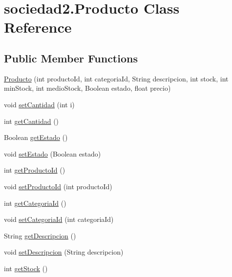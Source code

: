 \hypertarget{classsociedad2_1_1_producto}{}\section{sociedad2.\+Producto Class Reference}
\label{classsociedad2_1_1_producto}
\subsection*{Public Member Functions}
\begin{DoxyCompactItemize}
\item 
\mbox{\hyperlink{classsociedad2_1_1_producto_a5266f0ab65459040df5d351c60f46493}{Producto}} (int producto\+Id, int categoria\+Id, String descripcion, int stock, int min\+Stock, int medio\+Stock, Boolean estado, float precio)
\item 
void \mbox{\hyperlink{classsociedad2_1_1_producto_a6eec5e912ac94e10b15bc0a1e62d3a97}{set\+Cantidad}} (int i)
\item 
int \mbox{\hyperlink{classsociedad2_1_1_producto_ad1dffeff2d5eaa28cb0f4c3120bbf047}{get\+Cantidad}} ()
\item 
Boolean \mbox{\hyperlink{classsociedad2_1_1_producto_a60e7b61c9e1d4d0d1f57edee7871cadf}{get\+Estado}} ()
\item 
void \mbox{\hyperlink{classsociedad2_1_1_producto_a7f286e1bd9c4e7a16ba71cda04477139}{set\+Estado}} (Boolean estado)
\item 
int \mbox{\hyperlink{classsociedad2_1_1_producto_a501aad8759cd86d3bf35387f6f697970}{get\+Producto\+Id}} ()
\item 
void \mbox{\hyperlink{classsociedad2_1_1_producto_a5e27c5c7790d1918a32e71f51f9834f7}{set\+Producto\+Id}} (int producto\+Id)
\item 
int \mbox{\hyperlink{classsociedad2_1_1_producto_af32a011e6aa2e99af8882774a23bd368}{get\+Categoria\+Id}} ()
\item 
void \mbox{\hyperlink{classsociedad2_1_1_producto_a7b59257499e49df811a7e00bcfe3768a}{set\+Categoria\+Id}} (int categoria\+Id)
\item 
String \mbox{\hyperlink{classsociedad2_1_1_producto_a83b7e522c9dc622e0ca99a3b6243b57b}{get\+Descripcion}} ()
\item 
void \mbox{\hyperlink{classsociedad2_1_1_producto_a97c84a0e5bafd15bdc48f868d088fde7}{set\+Descripcion}} (String descripcion)
\item 
int \mbox{\hyperlink{classsociedad2_1_1_producto_ac1efc9575ff90b9af915066d43dd4bd4}{get\+Stock}} ()

\end{DoxyCompactItemize}
